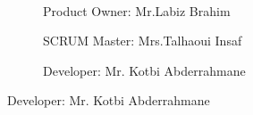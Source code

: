 \begin{frame}[fragile=singleslide]{\insertsectionhead}
  \framesubtitle{\insertsubsectionhead}
  \begin{figure}[ht!]
    \begin{subfigure}[b]{0.3\textwidth}
      \caption*{Product Owner: Mr.Labiz Brahim}
    \end{subfigure}
    \hspace{\fill}
    \begin{subfigure}[b]{0.3\textwidth}
      \caption*{SCRUM Master: Mrs.Talhaoui Insaf}
    \end{subfigure}
    \hspace{\fill}
    \begin{subfigure}[b]{0.3\textwidth}
      \caption*{Developer: Mr. Kotbi Abderrahmane}
    \end{subfigure}
  \end{figure}
\end{frame}

